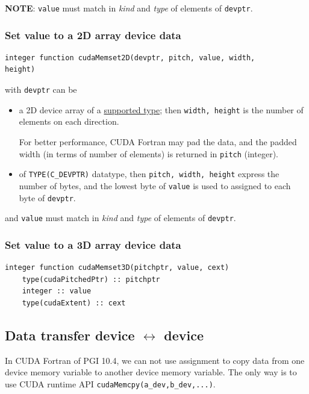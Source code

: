 {\bf NOTE}: \verb!value! must match in {\it kind} and {\it type} of
elements of \verb!devptr!.


\subsubsection{Set value to a 2D array device data}
\label{sec:set-value-2d}

\begin{lstlisting}
integer function cudaMemset2D(devptr, pitch, value, width,
height)
\end{lstlisting}
with \verb!devptr! can be
\begin{itemize}

\item a 2D device array of a
  \hyperref[sec:datatype-data-device]{supported type}; then
  \verb!width, height!  is the number of elements on each direction.

  For better performance, CUDA Fortran may pad the data, and the
  padded width (in terms of number of elements) is returned in
  \verb!pitch!  (integer).
\item of \verb!TYPE(C_DEVPTR)! datatype, then
  \verb!pitch, width, height! express the number of bytes, and the
  lowest byte of \verb!value! is used to assigned to each byte of
  \verb!devptr!.

\end{itemize}
and \verb!value! must match in {\it kind} and {\it type} of elements
of \verb!devptr!. 

\subsubsection{Set value to a 3D array device data}
\label{sec:set-value-3d}

\begin{lstlisting}
integer function cudaMemset3D(pitchptr, value, cext)
    type(cudaPitchedPtr) :: pitchptr
    integer :: value
    type(cudaExtent) :: cext
\end{lstlisting}

\subsection{Data transfer device $\leftrightarrow$ device}
\label{sec:data-transfer-device}

In CUDA Fortran of PGI 10.4, we can not use assignment to 
copy data from one device memory variable to another device memory
variable. The only way is to use CUDA runtime API 
\verb!cudaMemcpy(a_dev,b_dev,...)!. 

